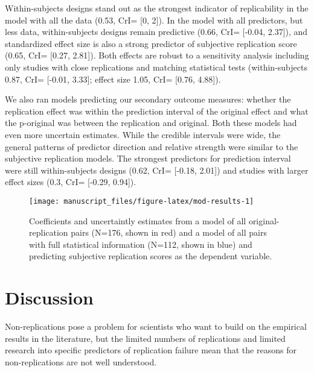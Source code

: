 \documentclass[
  english,
  a4paper,
]{article}
\begin{document}
Within-subjects designs stand out as the strongest indicator of replicability in the model with all the data (0.53, CrI= {[}0, 2{]}). In the model with all predictors, but less data, within-subjects designs remain predictive (0.66, CrI= {[}-0.04, 2.37{]}), and standardized effect size is also a strong predictor of subjective replication score (0.65, CrI= {[}0.27, 2.81{]}). Both effects are robust to a sensitivity analysis including only studies with close replications and matching statistical tests (within-subjects 0.87, CrI= {[}-0.01, 3.33{]}; effect size 1.05, CrI= {[}0.76, 4.88{]}).

We also ran models predicting our secondary outcome measures: whether the replication effect was within the prediction interval of the original effect and what the p-original was between the replication and original. Both these models had even more uncertain estimates. While the credible intervals were wide, the general patterns of predictor direction and relative strength were similar to the subjective replication models. The strongest predictors for prediction interval were still within-subjects designs (0.62, CrI= {[}-0.18, 2.01{]}) and studies with larger effect sizes (0.3, CrI= {[}-0.29, 0.94{]}).

\begin{figure}[ht]
\texttt{[image: manuscript\_files/figure-latex/mod-results-1]} \caption{Coefficients and uncertaintly estimates from a model of all original-replication pairs (N=176, shown in red) and a model of all pairs with full statistical information (N=112, shown in blue) and predicting subjective replication scores as the dependent variable. }\label{fig:mod-results}
\end{figure}

\hypertarget{discussion}{%
\section{Discussion}\label{discussion}}

Non-replications pose a problem for scientists who want to build on the empirical results in the literature, but the limited numbers of replications and limited research into specific predictors of replication failure mean that the reasons for non-replications are not well understood.
\end{document}
